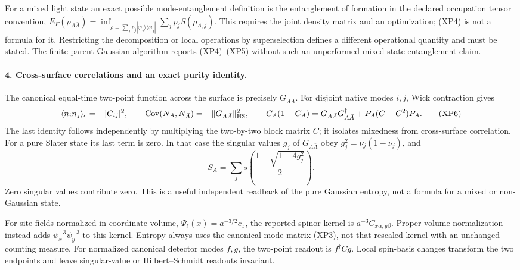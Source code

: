 \documentclass[11pt]{article}
\DeclareMathOperator{\Cov}{Cov}
\begin{document}
For a mixed light state an exact possible mode-entanglement
definition is the entanglement of formation in the declared
occupation tensor convention,
$E_F(\rho_{A\bar A})=\inf_{\rho=\sum_jp_j|\varphi_j\rangle
\langle\varphi_j|}\sum_jp_jS(\rho_{A,j})$.
This requires the joint density matrix and an optimization;
(XP4) is not a formula for it.  Restricting the decomposition
or local operations by superselection defines a different
operational quantity and must be stated.  The finite-parent
Gaussian algorithm reports (XP4)--(XP5) without such an
unperformed mixed-state entanglement claim.

\paragraph{4. Cross-surface correlations and an exact purity identity.}
The canonical equal-time two-point function across the surface
is precisely $G_{A\bar A}$.  For disjoint native modes $i,j$,
Wick contraction gives
\begin{equation}
 \langle n_i n_j\rangle_c=-|C_{ij}|^2,\qquad
 \Cov(N_A,N_{\bar A})=-\|G_{A\bar A}\|_{\rm HS}^2,\qquad
 C_A(1-C_A)=G_{A\bar A}G_{A\bar A}^\dagger
             +P_A(C-C^2)P_A .
 \tag{XP6}
\end{equation}
The last identity follows independently by multiplying the
two-by-two block matrix $C$; it isolates mixedness from
cross-surface correlation.  For a pure Slater state its last
term is zero.  In that case the singular values $g_j$ of
$G_{A\bar A}$ obey $g_j^2=\nu_j(1-\nu_j)$, and
\[
 S_A=\sum_j s\!\left(\frac{1-\sqrt{1-4g_j^2}}2\right).
\]
Zero singular values contribute zero.  This is a useful independent
readback of the pure Gaussian entropy, not a formula for a mixed
or non-Gaussian state.

For site fields normalized in coordinate volume,
$\Psi_\ell(x)=a^{-3/2}c_x$, the reported spinor kernel is
$a^{-3}C_{x\alpha,y\beta}$.  Proper-volume normalization instead
adds $\psi_x^{-3}\psi_y^{-3}$ to this kernel.
Entropy always uses the canonical mode matrix (XP3), not that
rescaled kernel with an unchanged counting measure.
For normalized canonical detector modes $f,g$, the two-point
readout is $f^\dagger Cg$.  Local spin-basis changes transform
the two endpoints and leave singular-value or Hilbert--Schmidt
readouts invariant.
\end{document}
